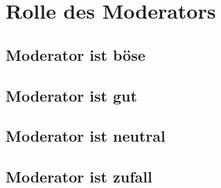 \chapter{Rolle des Moderators}

\section{Moderator ist böse}

\section{Moderator ist gut}

\section{Moderator ist neutral}

\section{Moderator ist zufall}